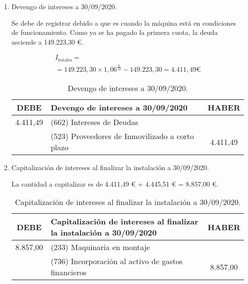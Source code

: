 \begin{enumerate}[label=\alph*)]
    \item Devengo de intereses a 30/09/2020.
    
    Se debe de registrar debido a que es cuando la máquina está en condiciones de funcionamiento. Como ya se ha pagado la primera cuota, la deuda asciende a 149.223,30 €.

    \begin{align*}
        I_{\text{totales}} = \\
        = 149.223,30 \times 1,06^{\frac{6}{12}} - 149.223,30 = 4.411,49 €
    \end{align*}

    \begin{table}[H]
        \centering
        \begin{tabular}{|c|p{6cm}|c|}
            \hline
            \rowcolor{blue!30}
            \textbf{DEBE} & \textbf{Devengo de intereses a 30/09/2020} & \textbf{HABER} \\
            \hline
            4.411,49 & (662) Intereses de Deudas & \\
            \hline
            & (523) Proveedores de Inmovilizado a corto plazo & 4.411,49 \\
            \hline
        \end{tabular}
        \caption{Devengo de intereses a 30/09/2020.}
        \label{tabla:devengo_intereses_septiembre_2020}
    \end{table}

    \item Capitalización de intereses al finalizar la instalación a 30/09/2020.
    
    La cantidad a capitalizar es de 4.411,49 € + 4.445,51 € = 8.857,00 €.

    \begin{table}[H]
        \centering
        \begin{tabular}{|c|p{8cm}|c|}
            \hline
            \rowcolor{blue!30}
            \textbf{DEBE} & \textbf{Capitalización de intereses al finalizar la instalación a 30/09/2020} & \textbf{HABER} \\
            \hline
            8.857,00 & (233) Maquinaria en montaje & \\
            \hline
            & (736) Incorporación al activo de gastos financieros & 8.857,00 \\
            \hline
        \end{tabular}
        \caption{Capitalización de intereses al finalizar la instalación a 30/09/2020.}
        \label{tabla:capitalizacion_intereses_septiembre_2020}
    \end{table}


\end{enumerate}
